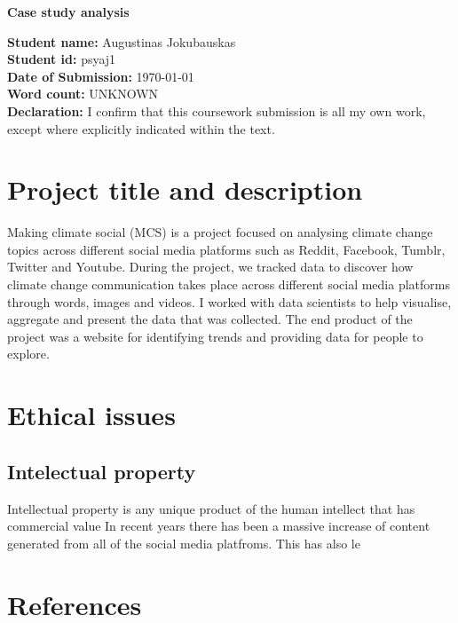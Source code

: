 \documentclass{article}
\begin{document}
\begin{titlepage}
   \begin{center}
      \Large\textbf{Case study analysis}\\
   \end{center}
   \bigskip
   \textbf{Student name: } Augustinas Jokubauskas\\
   \textbf{Student id: } psyaj1\\
   \textbf{Date of Submission: } \today\\
   \textbf{Word count: } UNKNOWN\\
   \textbf{Declaration: } I confirm that this coursework submission is all my
own work, except where explicitly indicated within
the text.
\end{titlepage}

\newpage

\section{Project title and description}
\begin{flushleft}
Making climate social (MCS) is a project focused on analysing climate change topics across different social media platforms such as Reddit, Facebook, Tumblr, Twitter and Youtube. During the project, we tracked data to discover how climate change communication takes place across different social media platforms through words, images and videos. I worked with data scientists to help visualise, aggregate and present the data that was collected. The end product of the project was a website for identifying trends and providing data for people to explore.
\end{flushleft}

\section{Ethical issues}

\subsection{Intelectual property}
\begin{flushleft}
Intellectual property is any unique product of the human intellect that has commercial value 
In recent years there has been a massive increase of content generated from all of the social media platfroms. This has also le
\cite{Doe:2009:Online}
\end{flushleft}

\begin{flushleft}

\end{flushleft}

\section{References}

\printbibliography
\end{document}
